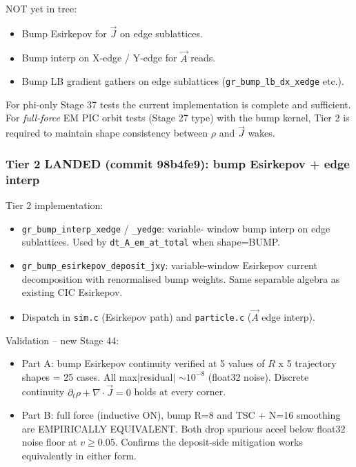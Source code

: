 \documentclass[11pt,a4paper]{article}
\begin{document}
NOT yet in tree:
\begin{itemize}
  \item Bump Esirkepov for $\vec J$ on edge sublattices.
  \item Bump interp on X-edge / Y-edge for $\vec A$ reads.
  \item Bump LB gradient gathers on edge sublattices
    (\texttt{gr\_bump\_lb\_dx\_xedge} etc.).
\end{itemize}

For phi-only Stage 37 tests the current implementation is complete
and sufficient.  For \emph{full-force} EM PIC orbit tests (Stage 27
type) with the bump kernel, Tier 2 is required to maintain shape
consistency between $\rho$ and $\vec J$ wakes.

\subsubsection*{Tier 2 LANDED (commit 98b4fe9): bump Esirkepov + edge interp}

Tier 2 implementation:
\begin{itemize}
  \item \texttt{gr\_bump\_interp\_xedge} / \texttt{\_yedge}: variable-
    window bump interp on edge sublattices.  Used by
    \texttt{dt\_A\_em\_at\_total} when shape=BUMP.
  \item \texttt{gr\_bump\_esirkepov\_deposit\_jxy}: variable-window
    Esirkepov current decomposition with renormalised bump weights.
    Same separable algebra as existing CIC Esirkepov.
  \item Dispatch in \texttt{sim.c} (Esirkepov path) and
    \texttt{particle.c} ($\vec A$ edge interp).
\end{itemize}

Validation -- new Stage 44:
\begin{itemize}
  \item Part A: bump Esirkepov continuity verified at 5 values of
    $R$ x 5 trajectory shapes = 25 cases.  All max$|$residual$|$
    $\sim 10^{-8}$ (float32 noise).  Discrete continuity
    $\partial_t\rho + \nabla\cdot\vec J = 0$ holds at every corner.
  \item Part B: full force (inductive ON), bump R=8 and TSC + N=16
    smoothing are EMPIRICALLY EQUIVALENT.  Both drop spurious accel
    below float32 noise floor at $v \geq 0.05$.  Confirms the
    deposit-side mitigation works equivalently in either form.
\end{itemize}
\end{document}
